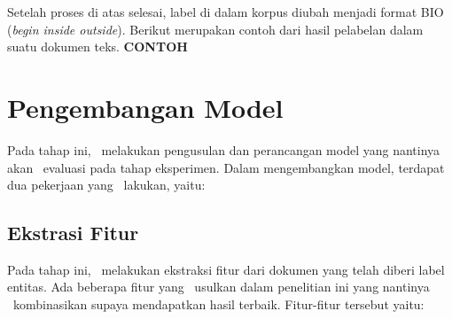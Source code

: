 Setelah proses di atas selesai, label di dalam korpus diubah menjadi format BIO (\textit{begin inside outside}). Berikut merupakan contoh dari hasil pelabelan dalam suatu dokumen teks.
\textbf{CONTOH}

\section{Pengembangan Model}
Pada tahap ini, \saya~melakukan pengusulan dan perancangan model yang nantinya akan \saya~evaluasi pada tahap eksperimen. Dalam mengembangkan model, terdapat dua pekerjaan yang \saya~lakukan, yaitu:

\subsection{Ekstrasi Fitur}\label{subbab:fitur}
Pada tahap ini, \saya~melakukan ekstraksi fitur dari dokumen yang telah diberi label entitas. Ada beberapa fitur yang \saya~usulkan dalam penelitian ini yang nantinya \saya~kombinasikan supaya mendapatkan hasil terbaik. Fitur-fitur tersebut yaitu:
